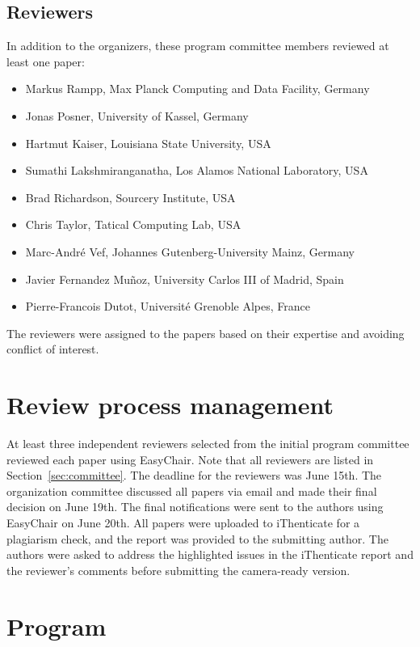 \documentclass{article}
\begin{document}
\subsection{Reviewers}
In addition to the organizers, these program committee members reviewed at least one paper:
\begin{itemize}
    \item Markus Rampp, Max Planck Computing and Data Facility, Germany
    \item Jonas Posner, University of Kassel, Germany
    \item Hartmut Kaiser, Louisiana State University, USA
    \item Sumathi Lakshmiranganatha, Los Alamos National Laboratory, USA
    \item Brad Richardson, Sourcery Institute, USA
    \item Chris Taylor, Tatical Computing Lab, USA
    \item  Marc-André Vef, Johannes Gutenberg-University Mainz, Germany
    \item Javier Fernandez Muñoz, University Carlos III of Madrid, Spain
    \item Pierre-Francois Dutot, Université Grenoble Alpes, France 
\end{itemize}
The reviewers were assigned to the papers based on their expertise and avoiding conflict of interest. 


\section{Review process management}
At least three independent reviewers selected from the initial program committee reviewed each paper using EasyChair. Note that all reviewers are listed in Section~\ref{sec:committee}. The deadline for the reviewers was June 15th. The organization committee discussed all papers via email and made their final decision on June 19th. The final notifications were sent to the authors using EasyChair on June 20th. All papers were uploaded to iThenticate for a plagiarism check, and the report was provided to the submitting author. The authors were asked to address the highlighted issues in the iThenticate report and the reviewer’s comments before submitting the camera-ready version. 


\section{Program}
\end{document}
